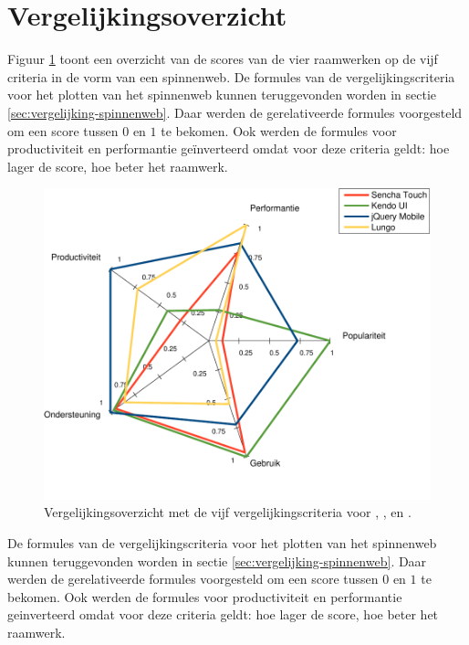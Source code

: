 \section{Vergelijkingsoverzicht}
\label{sec:evaluatie-spinnenweb}

Figuur \ref{fig:spinnenweb-final} toont een overzicht van de scores van de vier raamwerken op de vijf criteria in de vorm van een spinnenweb.
De formules van de vergelijkingscriteria voor het plotten van het spinnenweb kunnen teruggevonden worden in sectie \ref{sec:vergelijking-spinnenweb}.
Daar werden de gerelativeerde formules voorgesteld om een score tussen $0$ en $1$ te bekomen.
Ook werden de formules voor productiviteit en performantie geïnverteerd omdat voor deze criteria geldt:  hoe lager de score, hoe beter het raamwerk.

\begin{figure}
  \centering
  \includegraphics[width=\textwidth]{figuren/spidergraph-final-nl.pdf}
  \caption{Vergelijkingsoverzicht met de vijf vergelijkingscriteria voor \st{},  \kendo{},  \jqm{} en \lungo{}.}
  \label{fig:spinnenweb-final}
\end{figure}

De formules van de vergelijkingscriteria voor het plotten van het spinnenweb kunnen teruggevonden worden in sectie \ref{sec:vergelijking-spinnenweb}.
Daar werden de gerelativeerde formules voorgesteld om een score tussen $0$ en $1$ te bekomen.
Ook werden de formules voor productiviteit en performantie geinverteerd omdat voor deze criteria geldt:  hoe lager de score, hoe beter het raamwerk.

